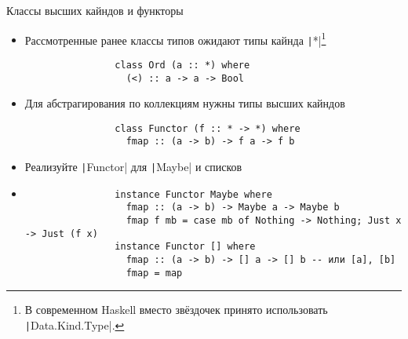
    \begin{frame}[fragile]{Классы высших кайндов и функторы}
        \begin{itemize}
            \item Рассмотренные ранее классы типов ожидают типы кайнда \texttt|*|\footnote{В современном Haskell вместо звёздочек принято использовать \texttt|Data.Kind.Type|.} %
            \begin{verbatim}
                class Ord (a :: *) where
                  (<) :: a -> a -> Bool
            \end{verbatim}
            \item Для абстрагирования по коллекциям нужны типы высших кайндов
            \begin{verbatim}
                class Functor (f :: * -> *) where
                  fmap :: (a -> b) -> f a -> f b
            \end{verbatim}
            \item[\todo] Реализуйте \texttt|Functor| для \texttt|Maybe| и списков %
            \item[\answer] \pause
            \begin{verbatim}
                instance Functor Maybe where
                  fmap :: (a -> b) -> Maybe a -> Maybe b
                  fmap f mb = case mb of Nothing -> Nothing; Just x -> Just (f x)
                instance Functor [] where
                  fmap :: (a -> b) -> [] a -> [] b -- или [a], [b]
                  fmap = map
            \end{verbatim}
        \end{itemize}
    \end{frame}

